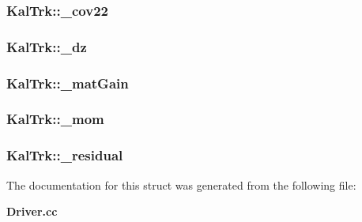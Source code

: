 \subsubsection[{\-\_\-cov22}]{ Kal\-Trk\-::\-\_\-cov22}\label{structKalTrk_a837038f91a6ddc647be27ee528716cb3}
\subsubsection[{\-\_\-dz}]{ Kal\-Trk\-::\-\_\-dz}\label{structKalTrk_ae2fb8029c3d8db4efbe63d64a3cd00e5}
\subsubsection[{\-\_\-mat\-Gain}]{ Kal\-Trk\-::\-\_\-mat\-Gain}\label{structKalTrk_a2bfff6dfccbe953c600fbd432b4b1b26}
\subsubsection[{\-\_\-mom}]{ Kal\-Trk\-::\-\_\-mom}\label{structKalTrk_a9e81bb1a9fc1fdd02b488a9e91ea1f71}
\subsubsection[{\-\_\-residual}]{ Kal\-Trk\-::\-\_\-residual}\label{structKalTrk_a532ae2ddc14325b61fbdc56b1b8777dc}


The documentation for this struct was generated from the following file\-:\begin{DoxyCompactItemize}
\item 
{\bf Driver.\-cc}\end{DoxyCompactItemize}
